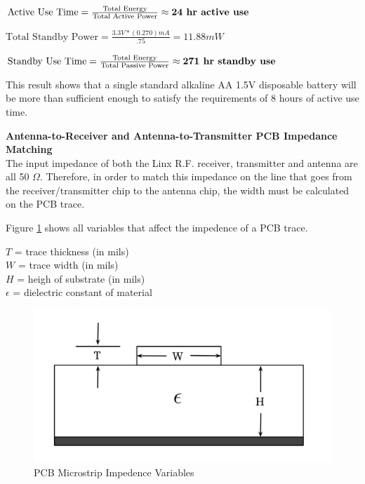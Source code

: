 \documentclass[letterpaper,10pt]{article}
\begin{document}
\begin{spacing}{1.15}
\begin{center}
	$\textrm{Active Use Time} = \frac{\textrm{Total Energy}}{\textrm{Total Active Power}} \approx \textrm{\textbf{24 hr active use}}$
	
	$\textrm{Total Standby Power} = \frac{3.3 V * (0.270) mA}{.75} = 11.88 mW$
	
	$\textrm{Standby Use Time} = \frac{\textrm{Total Energy}}{\textrm{Total Passive Power}} \approx \textrm{\textbf{271 hr  standby use}}$
\end{center}

This result shows that a single standard alkaline AA 1.5V disposable battery will be more than sufficient enough to satisfy the requirements of 8 hours of active use time.

\normalsize\textbf{Antenna-to-Receiver and Antenna-to-Transmitter PCB Impedance Matching} \\
The input impedance of both the Linx R.F. receiver, transmitter and antenna are all 50 $\Omega$. Therefore, in order to match this impedance on the line that goes from the receiver/transmitter chip to the antenna chip, the width must be calculated on the PCB trace. 

Figure \ref{fig:pcb-trace} shows all variables that affect the impedence of a PCB trace. 

\begin{center}
	$T $ = trace thickness (in mils) \\
	$W$ = trace width  (in mils) \\
	$H$ = heigh of substrate (in mils) \\
	$\epsilon$ = dielectric constant of material
\end{center}

\begin{figure} [H]
	\centering
	\includegraphics[scale=0.3]{PCB_Trace_Figure.png}
	\caption{PCB Microstrip Impedence Variables\label{fig:pcb-trace}}
\end{figure}


\end{spacing}
\end{document}
